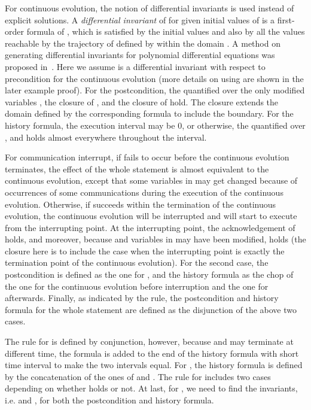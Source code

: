 \documentclass{llncs}
\begin{document}
For continuous evolution, the notion of differential invariants is used instead of explicit solutions.
A \emph{differential invariant} of 
for given initial values of  is a first-order formula of , which is satisfied by the initial values and also by all the values
reachable by the trajectory of  defined by  within the domain .
A method on generating differential invariants for polynomial differential equations was
proposed in~\cite{LZZ11}.
Here we assume  is a differential invariant with respect to precondition  for the continuous evolution (more details on using
 are shown in the later example proof). For the postcondition,
the quantified  over  the only
modified variables , the closure of , and the closure of
 hold. The closure   extends the domain defined by the corresponding formula to include the boundary.
For the history formula,  the execution interval may be 0, or otherwise, the quantified  over ,  and  holds almost everywhere throughout the
 interval.

For communication interrupt,
if  fails to occur before the continuous evolution terminates,
the effect of the whole statement is almost equivalent to  the continuous  evolution,
except that some variables in  may get changed because of occurrences of some communications
during the execution of the continuous  evolution.
Otherwise, if  succeeds within the termination of the continuous  evolution,
the continuous evolution will be interrupted and  will start to execute from the interrupting point.
At the interrupting point, the acknowledgement of  holds, and moreover,
because   and  variables in  may have been modified,
  holds (the closure here is to
include the case when the interrupting point is exactly the termination point of the continuous  evolution).
For the second case, the postcondition
is  defined as the one for , and the history formula as the chop of the one for
the continuous evolution before interruption and the one for  afterwards.
Finally, as indicated by the rule, the postcondition and history formula for the whole statement are defined as the disjunction of the above two cases.



The rule for  is defined by conjunction, however, because
 and  may terminate at different time,
the formula  is added to the end of the history formula with short time interval to make
the two intervals equal. For , the history formula is defined by the concatenation of the ones
of  and . The rule for  includes two cases depending on whether
 holds or not.
At last, for , we need to find the invariants, i.e.  and ,  for both the postcondition and history formula.
\end{document}
